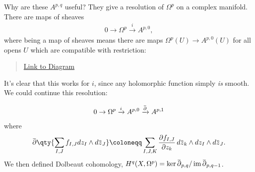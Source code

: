\begin{remark}

Why are these \(A^{p, q}\) useful? They give a resolution of
\(\Omega^p\) on a complex manifold. There are maps of sheaves
\begin{align*}
0 \to \Omega^p \xrightarrow{i} A^{p, 0}
,\end{align*}
where being a map of sheaves means there are maps
\(\Omega^p(U) \to A^{p, 0}(U)\) for all opens \(U\) which are compatible
with restriction:

\begin{center}
\end{center}

\begin{quote}
\href{https://q.uiver.app/?q=WzAsNCxbMCwwLCJcXE9tZWdhXnAoVSkiXSxbMCwyLCJcXE9tZWdhXnAoVikiXSxbMiwwLCJBXntwLCAwfShVKSJdLFsyLDIsIkFee3AsIDB9KFUpIl0sWzAsMiwiaV9VIl0sWzEsMywiaV9WIl0sWzAsMSwiXFxyaG9fe1VWfV4qIiwxLHsic3R5bGUiOnsiaGVhZCI6eyJuYW1lIjoibm9uZSJ9fX1dLFsyLDMsIlxccmhvX3tVVn1eKiIsMCx7InN0eWxlIjp7ImhlYWQiOnsibmFtZSI6Im5vbmUifX19XV0=}{Link
to Diagram}
\end{quote}

It's clear that this works for \(i\), since any holomorphic function
simply \emph{is} smooth. We could continue this resolution:

\begin{align*}
0 \to \Omega^p \xrightarrow{i} A^{p, 0} \xrightarrow{\mkern 1.5mu\overline{\mkern-1.5mu{\partial}\mkern-1.5mu}\mkern 1.5mu} A^{p, 1}
\end{align*}
where
\begin{align*}
\mkern 1.5mu\overline{\mkern-1.5mu{\partial}\mkern-1.5mu}\mkern 1.5mu\qty{ \sum_{I, J} f_{I, J} dz_I \wedge d\mkern 1.5mu\overline{\mkern-1.5muz\mkern-1.5mu}\mkern 1.5mu_J } 
\coloneqq
\sum_{I, J, K} {\frac{\partial f_{I, J}}{\partial z_k}\,} d \mkern 1.5mu\overline{\mkern-1.5muz\mkern-1.5mu}\mkern 1.5mu_k \wedge dz_I \wedge d\mkern 1.5mu\overline{\mkern-1.5muz\mkern-1.5mu}\mkern 1.5mu_J
.\end{align*}
We then defined Dolbeaut cohomology,
\(H^q(X, \Omega^p) = \ker \mkern 1.5mu\overline{\mkern-1.5mu{\partial}\mkern-1.5mu}\mkern 1.5mu_{p, q} / \operatorname{im}\mkern 1.5mu\overline{\mkern-1.5mu{\partial}\mkern-1.5mu}\mkern 1.5mu_{p, q-1}\).

\end{remark}

